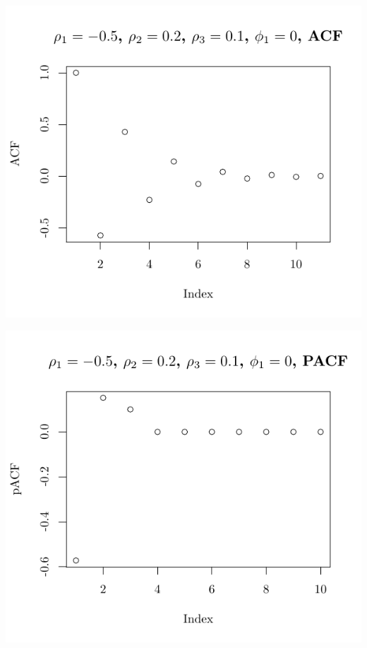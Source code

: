 \documentclass[10pt]{paper}\usepackage[]{graphicx}\usepackage[]{color}
\makeatletter
\def\maxwidth{ %
  \ifdim\Gin@nat@width>\linewidth
    \linewidth
  \else
    \Gin@nat@width
  \fi
}
\newenvironment{knitrout}{}{} %
\makeatother
\begin{document}
\begin{knitrout}
{\centering \includegraphics[width=\maxwidth]{figure/graphics-plotter-103} 

}




{\centering \includegraphics[width=\maxwidth]{figure/graphics-plotter-104} 

}





\end{knitrout}
\end{document}
